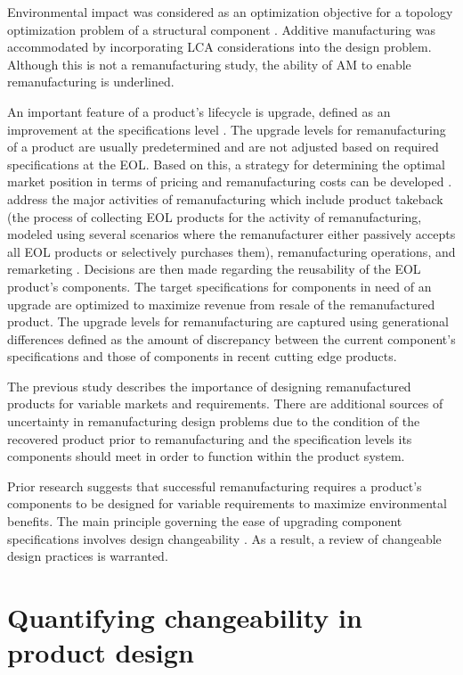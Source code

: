 Environmental impact was considered as an optimization objective for a topology optimization problem of a structural component \cite{Tang2016}. Additive manufacturing was accommodated by incorporating \ac{LCA} considerations into the design problem. Although this is not a remanufacturing study, the ability of \ac{AM} to enable remanufacturing is underlined.

An important feature of a product's lifecycle is upgrade, defined as an improvement at the specifications level \cite{Xing2007}. The upgrade levels for remanufacturing of a product are usually predetermined and are not adjusted based on required specifications at the \ac{EOL}. Based on this, a strategy for determining the optimal market position in terms of pricing and remanufacturing costs can be developed \cite{Kwak2013}. \citeauthor{Kwak2013} address the major activities of remanufacturing which include product takeback (the process of collecting \ac{EOL} products for the activity of remanufacturing, modeled using several scenarios where the remanufacturer either passively accepts all \ac{EOL} products or selectively purchases them), remanufacturing operations, and remarketing \cite{Kwak2013}. Decisions are then made regarding the reusability of the \ac{EOL} product's components. The target specifications for components in need of an upgrade are optimized to maximize revenue from resale of the remanufactured product. The upgrade levels for remanufacturing are captured using generational differences defined as the amount of discrepancy between the current component's specifications and those of components in recent cutting edge products.

The previous study describes the importance of designing remanufactured products for variable markets and requirements. There are additional sources of uncertainty in remanufacturing design problems due to the condition of the recovered product prior to remanufacturing and the specification levels its components should meet in order to function within the product system.

Prior research suggests that successful remanufacturing requires a product's components to be designed for variable requirements to maximize environmental benefits. The main principle governing the ease of upgrading component specifications involves design changeability \cite{Suh2007}. As a result, a review of changeable design practices is warranted.

\section{Quantifying changeability in product design}
\label{sec:changeability}

